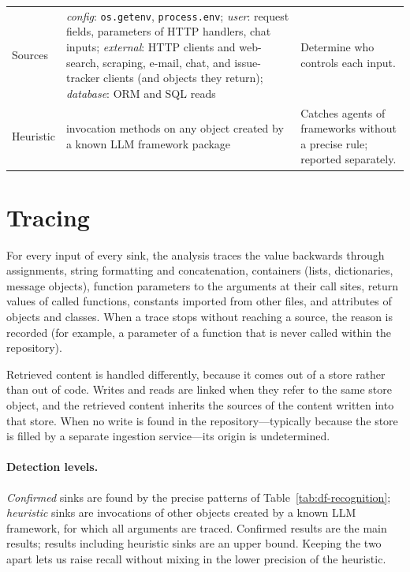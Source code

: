\begin{table}[t]
\begin{tabular}{@{}>{\raggedright\arraybackslash}p{}>{\raggedright\arraybackslash}p{}>{\raggedright\arraybackslash}p{}@{}}
Sources & \emph{config}: \texttt{os.getenv}, \texttt{process.env}; \emph{user}: request fields, parameters of HTTP handlers, chat inputs; \emph{external}: HTTP clients and web-search, scraping, e-mail, chat, and issue-tracker clients (and objects they return); \emph{database}: ORM and SQL reads & Determine who controls each input. \\
Heuristic & invocation methods on any object created by a known LLM framework package & Catches agents of frameworks without a precise rule; reported separately. \\
\bottomrule
\end{tabular}
\end{table}

\section{Tracing}
\label{sec:df-analysis}

For every input of every sink, the analysis traces the value backwards through assignments, string formatting and concatenation, containers (lists, dictionaries, message objects), function parameters to the arguments at their call sites, return values of called functions, constants imported from other files, and attributes of objects and classes. When a trace stops without reaching a source, the reason is recorded (for example, a parameter of a function that is never called within the repository).

Retrieved content is handled differently, because it comes out of a store rather than out of code. Writes and reads are linked when they refer to the same store object, and the retrieved content inherits the sources of the content written into that store. When no write is found in the repository---typically because the store is filled by a separate ingestion service---its origin is undetermined.

\paragraph{Detection levels.} \emph{Confirmed} sinks are found by the precise patterns of Table~\ref{tab:df-recognition}; \emph{heuristic} sinks are invocations of other objects created by a known LLM framework, for which all arguments are traced. Confirmed results are the main results; results including heuristic sinks are an upper bound. Keeping the two apart lets us raise recall without mixing in the lower precision of the heuristic.

